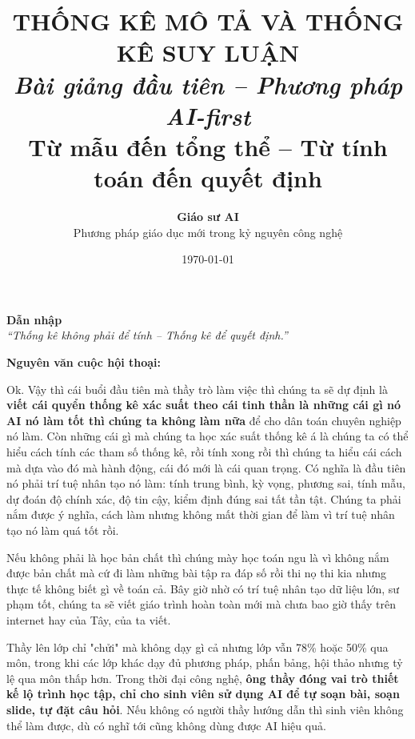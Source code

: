 \documentclass[a4paper,12pt]{article}
\title{
    \vspace{-1.5cm}
    {\color{maincolor}\textbf{\huge THỐNG KÊ MÔ TẢ VÀ THỐNG KÊ SUY LUẬN}}\\[0.2cm]
    {\Large \textit{Bài giảng đầu tiên – Phương pháp AI-first}}\\[0.3cm]
    {\large Từ mẫu đến tổng thể – Từ tính toán đến quyết định}
}
\author{
    \textcolor{maincolor}{\textbf{Giáo sư AI}}\\
    \small Phương pháp giáo dục mới trong kỷ nguyên công nghệ
}
\date{\today}
\theoremstyle{remark}
\begin{document}
\maketitle
\thispagestyle{fancy}
\tableofcontents

\newpage
\begin{center}
    {\Large\color{secondcolor}\textbf{Dẫn nhập}}\\[0.4cm]
    \textit{\textcolor{maincolor}{“Thống kê không phải để tính – Thống kê để quyết định.”}}
\end{center}
\vspace{0.5cm}

{\scriptfont
\noindent\textcolor{dialoguecolor}{\textbf{Nguyên văn cuộc hội thoại:}}

\vspace{0.3cm}

\noindent\textcolor{dialoguecolor}{Ok. Vậy thì cái buổi đầu tiên mà thầy trò làm việc thì chúng ta sẽ dự định là \textbf{viết cái quyển thống kê xác suất theo cái tinh thần là những cái gì nó AI nó làm tốt thì chúng ta không làm nữa} để cho dân toán chuyên nghiệp nó làm. Còn những cái gì mà chúng ta học xác suất thống kê á là chúng ta có thể hiểu cách tính các tham số thống kê, rồi tính xong rồi thì chúng ta hiểu cái cách mà dựa vào đó mà hành động, cái đó mới là cái quan trọng. Có nghĩa là đầu tiên nó phải trí tuệ nhân tạo nó làm: tính trung bình, kỳ vọng, phương sai, tính mẫu, dự đoán độ chính xác, độ tin cậy, kiểm định đúng sai tất tần tật. Chúng ta phải nắm được ý nghĩa, cách làm nhưng không mất thời gian để làm vì trí tuệ nhân tạo nó làm quá tốt rồi.}

\vspace{0.2cm}

\noindent\textcolor{dialoguecolor}{Nếu không phải là học bản chất thì chúng mày học toán ngu là vì không nắm được bản chất mà cứ đi làm những bài tập ra đáp số rồi thi nọ thi kia nhưng thực tế không biết gì về toán cả. Bây giờ nhờ có trí tuệ nhân tạo dữ liệu lớn, sư phạm tốt, chúng ta sẽ viết giáo trình hoàn toàn mới mà chưa bao giờ thấy trên internet hay của Tây, của ta viết.}

\vspace{0.2cm}

\noindent\textcolor{dialoguecolor}{Thầy lên lớp chỉ "chửi" mà không dạy gì cả nhưng lớp vẫn 78\% hoặc 50\% qua môn, trong khi các lớp khác dạy đủ phương pháp, phấn bảng, hội thảo nhưng tỷ lệ qua môn thấp hơn. Trong thời đại công nghệ, \textbf{ông thầy đóng vai trò thiết kế lộ trình học tập, chỉ cho sinh viên sử dụng AI để tự soạn bài, soạn slide, tự đặt câu hỏi}. Nếu không có người thầy hướng dẫn thì sinh viên không thể làm được, dù có nghĩ tới cũng không dùng được AI hiệu quả.}

}
\end{document}
